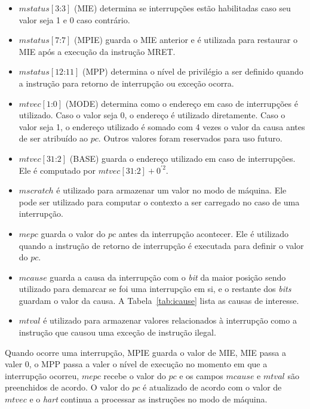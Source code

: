   \begin{itemize}
    \item $mstatus[3\text{:}3]$ (MIE) determina se interrupções estão habilitadas caso seu valor seja 1 e 0 caso contrário.
    \item $mstatus[7\text{:}7]$ (MPIE) guarda o MIE anterior e é utilizada para restaurar o MIE após a execução
          da instrução MRET.
    \item $mstatus[12\text{:}11]$ (MPP) determina o nível de privilégio a ser definido quando a instrução para retorno de 
          interrupção ou exceção ocorra.
    \item $mtvec[1\text{:}0]$ (MODE) determina como o endereço em caso de interrupções é utilizado. Caso o valor seja
          0, o endereço é utilizado diretamente. Caso o valor seja 1, o endereço utilizado é somado com 4 vezes o valor
          da causa antes de ser atribuído ao $pc$. Outros valores foram reservados para uso futuro.
    \item $mtvec[31\text{:}2]$ (BASE) guarda o endereço utilizado em caso de interrupções. Ele é computado por
          $ mtvec[31\text{:}2] + 0^{'2} $.
    \item $mscratch$ é utilizado para armazenar um valor no modo de máquina. Ele pode ser utilizado para computar o
          contexto a ser carregado no caso de uma interrupção.
    \item $mepc$ guarda o valor do $pc$ antes da interrupção acontecer. Ele é utilizado quando a instrução de retorno de
          interrupção é executada para definir o valor do $pc$.
    \item $mcause$ guarda a causa da interrupção com o \emph{bit} da maior posição sendo utilizado para demarcar se foi
          uma interrupção em si, e o restante dos \emph{bits} guardam o valor da causa.
          A Tabela~\ref{tab:icause} lista as causas de interesse.
    \item $mtval$ é utilizado para armazenar valores relacionados à interrupção como a instrução que causou uma exceção
          de instrução ilegal.
  \end{itemize}

  Quando ocorre uma interrupção, MPIE guarda o valor de MIE, MIE passa a valer 0, o MPP passa a valer o nível
  de execução no momento em que a interrupção ocorreu, $mepc$ recebe o valor do $pc$ e os campos $mcause$ e $mtval$
  são preenchidos de acordo. O valor do $pc$ é atualizado de acordo com o valor de $mtvec$ e o \emph{hart}
  continua a processar as instruções no modo de máquina.

